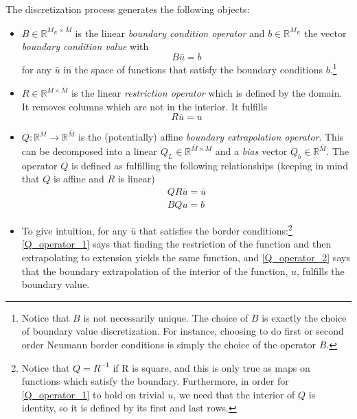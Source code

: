 \documentclass[11pt]{article}
\newcommand{\R}{\ensuremath{\mathbb{R}}}
\begin{document}
	The discretization process generates the following objects:
	\begin{itemize}
		\item $B\in \R^{M_E \times \bar{M}}$ is the linear \textit{boundary condition operator} and $b \in \R^{M_E}$ the vector \textit{boundary condition value} with
		\begin{equation}
		B \bar{u} = b
		\label{B_operator_block}
		\end{equation}
		for any $\bar{u}$ in the space of functions that satisfy the boundary conditions $b$.\footnote{
Notice that $B$ is not necessarily unique. The choice of $B$ is exactly the choice of boundary value discretization. For instance, choosing to do first or second order Neumann border conditions is simply the choice of the operator $B$.}
		\item $R\in \R^{M\times \bar{M}}$ is the linear \textit{restriction operator} which is defined by the domain. It removes columns which are not in the interior. It fulfills
		\begin{equation}
		R \bar{u} = u \label{R_operator}
		\end{equation}

		\item $Q : \R^M \to \R^{\bar{M}}$ is the (potentially) affine \textit{boundary extrapolation operator}.  This can be decomposed into a linear $Q_L \in \R^{\bar{M}\times M}$ and a \textit{bias} vector $Q_b \in \R^{\bar{M}}$.  The operator $Q$ is defined as fulfilling the following relationships (keeping in mind that $Q$ is affine and $R$ is linear)
		\begin{align}
		Q  R\bar{u} = \bar{u}\label{Q_operator_1}\\
		B Q u  = b	\label{Q_operator_2}
	\end{align}
	\item To give intuition, for any $\bar{u}$ that satisfies the border conditions:\footnote{Notice that $Q = R^{-1}$ if R is square, and this is only true as maps on functions which satisfy the boundary.  Furthermore, in order for \cref{Q_operator_1} to hold on trivial $u$, we need that the interior of $Q$ is identity, so it is defined by its first and last rows.} \cref{Q_operator_1} says that finding the restriction of the function and then extrapolating to extension yields the same function, and \cref{Q_operator_2} says that the boundary extrapolation of the interior of the function, $u$, fulfills the boundary value.
		\end{itemize}
\end{document}
